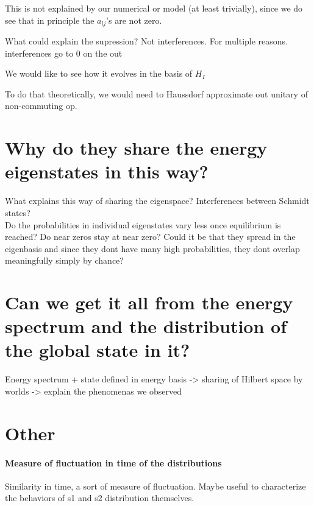\documentclass{article}
\begin{document}
This is not explained by our numerical or model (at least trivially), since we do see that in principle the $a_{lj}$'s are not zero.

What could explain the supression? Not interferences. For multiple reasons. interferences go to 0 on the out


We would like to see how it evolves in the basis of $H_I$

To do that theoretically, we would need to Haussdorf approximate out unitary of non-commuting op.


\newpage


\section{Why do they share the energy eigenstates in this way?}
 

What explains this way of sharing the eigenspace? Interferences between Schmidt states? \\

{\color{teal} Do the probabilities in individual eigenstates vary less once equilibrium is reached? Do near zeros stay at near zero? Could it be that they spread in the eigenbasis and since they dont have many high probabilities, they dont overlap meaningfully simply by chance?}

\section{Can we get it all from the energy spectrum and the distribution of the global state in it?}

Energy spectrum + state defined in energy basis -> sharing of Hilbert space by worlds -> explain the phenomenas we observed




\section{Other}


\paragraph{Measure of fluctuation in time of the distributions}
Similarity in time, a sort of measure of fluctuation. Maybe useful to characterize the behaviors of s1 and s2 distribution themselves.\\
\end{document}
